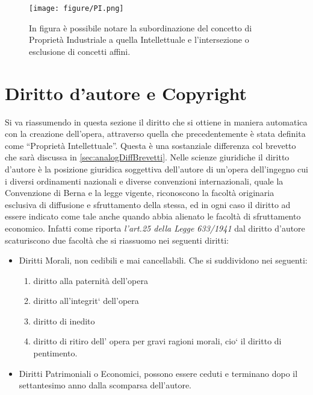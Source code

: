 \begin{figure}[bh]
	\begin{center}
		\texttt{[image: figure/PI.png]}
	\end{center}
	\caption{In figura è possibile notare la subordinazione del concetto di Proprietà Industriale a quella Intellettuale e l'intersezione o esclusione di concetti affini.}
\end{figure}



\section{Diritto d'autore e Copyright}
Si va riassumendo in questa sezione il diritto che si ottiene in maniera automatica con la creazione dell'opera, attraverso quella che precedentemente è stata definita come ``Proprietà Intellettuale''. Questa è una sostanziale differenza col brevetto che sarà discussa in \ref{sec:analogDiffBrevetti}.
Nelle scienze giuridiche il diritto d'autore è la posizione giuridica soggettiva dell'autore di un'opera dell'ingegno cui i diversi ordinamenti nazionali e diverse convenzioni internazionali, quale la Convenzione di Berna e la legge vigente, riconoscono la facoltà originaria esclusiva di diffusione e sfruttamento della stessa, ed in ogni caso il diritto ad essere indicato come tale anche quando abbia alienato le facoltà di sfruttamento economico.
Infatti come riporta \textit{l'art.25 della Legge 633/1941} dal diritto d'autore scaturiscono due facoltà che si riassuomo nei seguenti diritti:
\begin{itemize}
 \item Diritti Morali, non cedibili e mai cancellabili. Che si suddividono nei seguenti:

\begin{enumerate}
\item diritto alla paternità dell’opera
\item diritto all’integrit` dell’opera
\item diritto di inedito
\item diritto di ritiro dell’ opera per gravi ragioni morali, cio` il diritto di pentimento.
\end{enumerate}

 \item Diritti Patrimoniali o Economici, possono essere ceduti e terminano dopo il settantesimo anno dalla scomparsa dell'autore.
\end{itemize}



